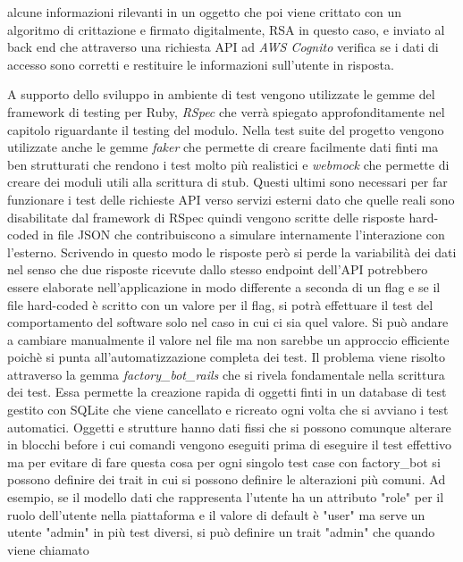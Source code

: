 \documentclass[target=bach,aauheader=,style=]{thud}
\begin{document}
alcune informazioni rilevanti in un oggetto che poi viene crittato con un algoritmo di crittazione e firmato digitalmente, RSA in questo caso, e inviato al back end
che attraverso una richiesta API ad \textit{AWS Cognito} verifica se i dati di accesso sono corretti e restituire le informazioni sull'utente in risposta.
\par A supporto dello sviluppo in ambiente di test vengono utilizzate le gemme del framework di testing per Ruby, \textit{RSpec}\cite{rspec_home} che verrà spiegato
approfonditamente nel capitolo riguardante il testing del modulo. Nella test suite del progetto vengono utilizzate anche le gemme \textit{faker}\cite{faker_gem}
che permette di creare facilmente dati finti ma ben strutturati che rendono i test molto più realistici e \textit{webmock} che permette di creare dei moduli utili
alla scrittura di stub. Questi ultimi sono necessari per far funzionare i test delle richieste API verso servizi esterni dato che quelle reali sono disabilitate
dal framework di RSpec quindi vengono scritte delle risposte hard-coded in file JSON che contribuiscono a simulare internamente l'interazione con l'esterno.
Scrivendo in questo modo le risposte però si perde la variabilità dei dati nel senso che due risposte ricevute dallo stesso endpoint dell'API potrebbero essere
elaborate nell'applicazione in modo differente a seconda di un flag e se il file hard-coded è scritto con un valore per il flag, si potrà effettuare il test del
comportamento del software solo nel caso in cui ci sia quel valore. Si può andare a cambiare manualmente il valore nel file ma non sarebbe un approccio efficiente
poichè si punta all'automatizzazione completa dei test. Il problema viene risolto attraverso la gemma \textit{factory\_bot\_rails}\cite{factory_bot_rails_gem} che
si rivela fondamentale nella scrittura dei test. Essa permette la creazione rapida di oggetti finti in un database di test gestito con SQLite
che viene cancellato e ricreato ogni volta che si avviano i test automatici. Oggetti e strutture hanno dati fissi che si possono comunque alterare in blocchi
before i cui comandi vengono eseguiti prima di eseguire il test effettivo ma per evitare di fare questa cosa per ogni singolo test case con factory\_bot si possono
definire dei trait in cui si possono definire le alterazioni più comuni. Ad esempio, se il modello dati che rappresenta l'utente ha un attributo "role" per il ruolo
dell'utente nella piattaforma e il valore di default è "user" ma serve un utente "admin" in più test diversi, si può definire un trait "admin" che quando viene chiamato
\end{document}
